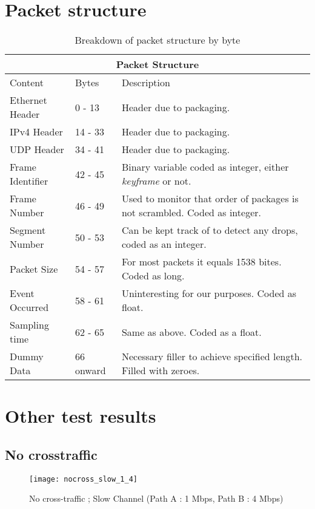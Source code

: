 \chapter{Packet structure}
\thispagestyle{empty}%
\begin{table}[htbp]
\caption{Breakdown of packet structure by byte}
\break
\setlength{\arrayrulewidth}{1mm}
\setlength{\tabcolsep}{12pt}
\renewcommand{\arraystretch}{1.5}
 {
\begin{tabular}{ |p{3cm}|p{2cm}|p{8cm}|  }
\hline
\multicolumn{3}{|c|}{Packet Structure} \\
\hline
Content & Bytes & Description \\
\hline
Ethernet Header & 0 - 13 & Header due to packaging. \\
IPv4 Header & 14 - 33 & Header due to packaging. \\
UDP Header & 34 - 41 & Header due to packaging. \\
Frame Identifier & 42 - 45 & Binary variable coded as integer, either \textit{keyframe} or not. \\
Frame Number & 46 - 49 & Used to monitor that order of packages is not scrambled. Coded as integer. \\
Segment Number & 50 - 53 & Can be kept track of to detect any drops, coded as an integer. \\
Packet Size & 54 - 57 & For most packets it equals 1538 bites. Coded as long. \\
Event Occurred & 58 - 61 & Uninteresting for our purposes. Coded as float. \\
Sampling time & 62 - 65 & Same as above. Coded as a float. \\
Dummy Data & 66 onward & Necessary filler to achieve specified length. Filled with zeroes. \\
\hline
\end{tabular}
}
\end{table}

\chapter{Other test results}
\thispagestyle{empty}

\section{No crosstraffic}


\begin{figure}[!ht]
\caption{No cross-traffic ; Slow Channel (Path A : 1 Mbps, Path B : 4 Mbps)}
\centering
\texttt{[image: nocross\_slow\_1\_4]}
\end{figure}


